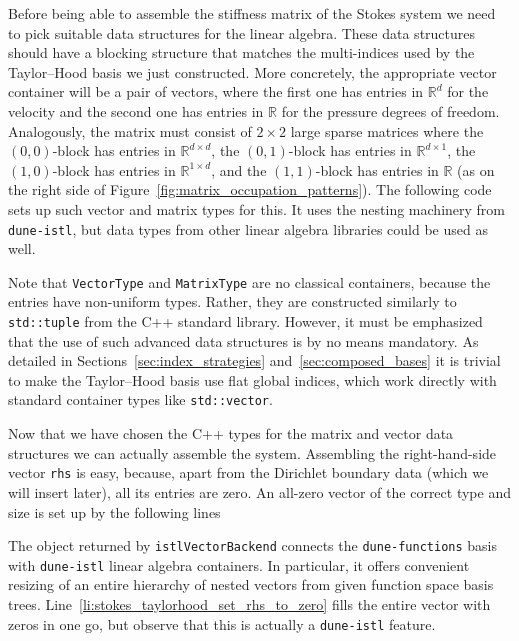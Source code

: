 \documentclass[a4paper,10pt,headings=normal,bibliography=totoc]{scrartcl}
\newcommand{\cpp}[1]{\lstinline[basicstyle=\ttfamily]!#1!}
\newcommand{\R}{\mathbb{R}}
\newcommand{\dunemodule}[1]{\texttt{#1}}
\begin{document}
Before being able to assemble the stiffness matrix of the Stokes system we need to pick suitable data structures
for the linear algebra.
These data structures should have a blocking structure that matches the multi-indices
used by the Taylor--Hood basis we just constructed.  More concretely,
the appropriate vector container will be a pair of vectors, where the first one
has entries in $\mathbb{R}^d$ for the velocity and the second one has entries in $\mathbb{R}$
for the pressure degrees of freedom.  Analogously, the matrix must consist of
$2 \times 2$ large sparse matrices where
the $(0,0)$-block has entries in $\R^{d\times d}$,
the $(0,1)$-block has entries in $\R^{d\times 1}$,
the $(1,0)$-block has entries in $\R^{1\times d}$,
and the $(1,1)$-block has entries in $\R$
(as on the right side of Figure~\ref{fig:matrix_occupation_patterns}).
The following code sets up such vector and matrix types for this.
It uses the nesting machinery from \dunemodule{dune-istl},
but data types from other linear algebra libraries could be used as well.
%

%
Note that \cpp{VectorType} and \cpp{MatrixType}
are no classical containers, because the entries have non-uniform types.
Rather, they are constructed similarly to \cpp{std::tuple} from the C++ standard library.
However, it must be emphasized that the use of such advanced data structures is by no
means mandatory. As detailed in Sections~\ref{sec:index_strategies}
and~\ref{sec:composed_bases} it is trivial to make the Taylor--Hood basis
use flat global indices, which work directly with standard container types like \cpp{std::vector}.

Now that we have chosen the C++ types for the matrix and vector data structures we can actually assemble the system.
Assembling the right-hand-side vector \cpp{rhs} is easy, because, apart from the Dirichlet boundary data (which we
will insert later), all its entries are zero.  An all-zero vector of the correct type and size is set up by the
following lines
%

%
The object returned by \cpp{istlVectorBackend} connects the \dunemodule{dune-functions}
basis with \dunemodule{dune-istl} linear algebra containers.
In particular, it offers convenient resizing of an entire hierarchy of nested vectors
from given function space basis trees.
Line~\ref{li:stokes_taylorhood_set_rhs_to_zero} fills the entire vector with zeros
in one go, but observe that this is actually a \dunemodule{dune-istl} feature.
\end{document}
